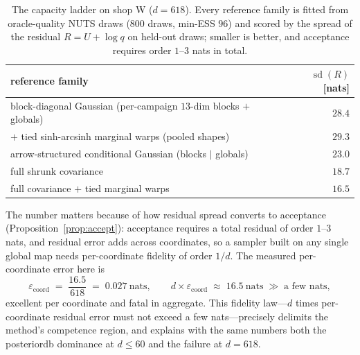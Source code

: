 \documentclass[11pt]{article}
\theoremstyle{remark}
\begin{document}
\begin{table}[t]
\caption{The capacity ladder on shop W ($d{=}618$). Every reference
family is fitted from oracle-quality NUTS draws ($800$ draws, min-ESS
$96$) and scored by the spread of the residual $R=U+\log q$ on
held-out draws; smaller is better, and acceptance requires order
$1$--$3$ nats in total.}
\label{tab:ladder}
\centering\small
\begin{tabular}{lr}
\toprule
reference family & $\operatorname{sd}(R)$ [nats]\\
\midrule
block-diagonal Gaussian (per-campaign $13$-dim blocks $+$ globals) & $28.4$\\
\quad$+$ tied sinh-arcsinh marginal warps (pooled shapes) & $29.3$\\
arrow-structured conditional Gaussian (blocks $\mid$ globals) & $23.0$\\
full shrunk covariance & $18.7$\\
full covariance $+$ tied marginal warps & $16.5$\\
\bottomrule
\end{tabular}
\end{table}

The number matters because of how residual spread converts to
acceptance (Proposition~\ref{prop:accept}): acceptance requires a
total residual of order $1$--$3$ nats, and residual error adds across
coordinates, so a sampler built on any single global map needs
per-coordinate fidelity of order $1/d$. The measured per-coordinate
error here is
\begin{equation}
\varepsilon_{\mathrm{coord}}
\;=\;\frac{16.5}{618}
\;=\;0.027\ \text{nats},
\qquad
d\times\varepsilon_{\mathrm{coord}}
\;\approx\;16.5\ \text{nats}
\;\gg\;\text{a few nats},
\label{eq:fidelity}
\end{equation}
excellent per coordinate and fatal in aggregate. This fidelity
law---$d$ times per-coordinate residual error must not exceed a few
nats---precisely delimits the method's competence region, and
explains with the same numbers both the posteriordb dominance at
$d\le60$ and the failure at $d{=}618$.
\end{document}
